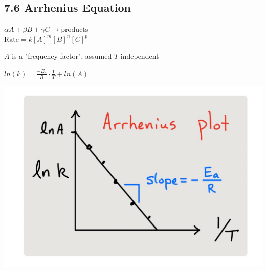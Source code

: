 \subsection{7.6 Arrhenius Equation}
    \vspace*{0.0em}
    $\alpha A + \beta B + \gamma C \longrightarrow \text{products}$\\
    $\text{Rate} = k[A]^m [B]^n [C]^p$


    $A$ is a "frequency factor", assumed $T$-independent
    \vspace*{0.5em}

    \begin{minipage}{0.99\linewidth}
        \begin{minipage}{0.49\linewidth}
            \centerline{$ln(k) = \frac{-E_a}{R} \cdot \frac{1}{T} + ln(A)$}
        \end{minipage}
        \begin{minipage}{0.49\linewidth}
            \centerline{\includegraphics[width=0.8\linewidth]{src/7_Kinetics/images/arrhenius_plot.pdf}}
        \end{minipage}
    \end{minipage}